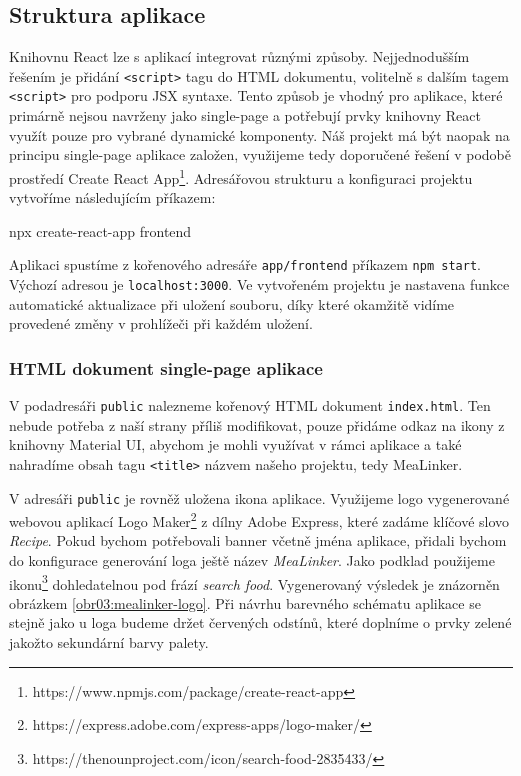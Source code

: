\subsection{Struktura aplikace}

Knihovnu React lze s aplikací integrovat různými způsoby. Nejjednodušším řešením je přidání \texttt{<script>} tagu do HTML dokumentu, volitelně s dalším tagem \texttt{<script>} pro podporu JSX syntaxe. Tento způsob je vhodný pro aplikace, které primárně nejsou navrženy jako single-page a potřebují prvky knihovny React využít pouze pro vybrané dynamické komponenty. Náš projekt má být naopak na principu single-page aplikace založen, využijeme tedy doporučené řešení v podobě prostředí Create React App\footnote{https://www.npmjs.com/package/create-react-app}. Adresářovou strukturu a konfiguraci projektu vytvoříme následujícím příkazem:
\begin{code}
npx create-react-app frontend
\end{code}

Aplikaci spustíme z kořenového adresáře \texttt{app/frontend} příkazem \texttt{npm\,start}. Výchozí adresou je \texttt{localhost:3000}. Ve vytvořeném projektu je nastavena funkce automatické aktualizace při uložení souboru, díky které okamžitě vidíme provedené změny v prohlížeči při každém uložení.

\subsubsection{HTML dokument single-page aplikace}

V podadresáři \texttt{public} nalezneme kořenový HTML dokument \texttt{index.html}. Ten nebude potřeba z naší strany příliš modifikovat, pouze přidáme odkaz na ikony z knihovny Material UI, abychom je mohli využívat v rámci aplikace a také nahradíme obsah tagu \texttt{<title>} názvem našeho projektu, tedy MeaLinker.

V adresáři \texttt{public} je rovněž uložena ikona aplikace. Využijeme logo vygenerované webovou aplikací Logo Maker\footnote{https://express.adobe.com/express-apps/logo-maker/} z dílny Adobe Express, které zadáme klíčové slovo \emph{Recipe}. Pokud bychom potřebovali banner včetně jména aplikace, přidali bychom do konfigurace generování loga ještě název \emph{MeaLinker}. Jako podklad použijeme ikonu\footnote{https://thenounproject.com/icon/search-food-2835433/} dohledatelnou pod frází \emph{search food}. Vygenerovaný výsledek je znázorněn obrázkem \ref{obr03:mealinker-logo}. Při návrhu barevného schématu aplikace se stejně jako u loga budeme držet červených odstínů, které doplníme o prvky zelené jakožto sekundární barvy palety.

